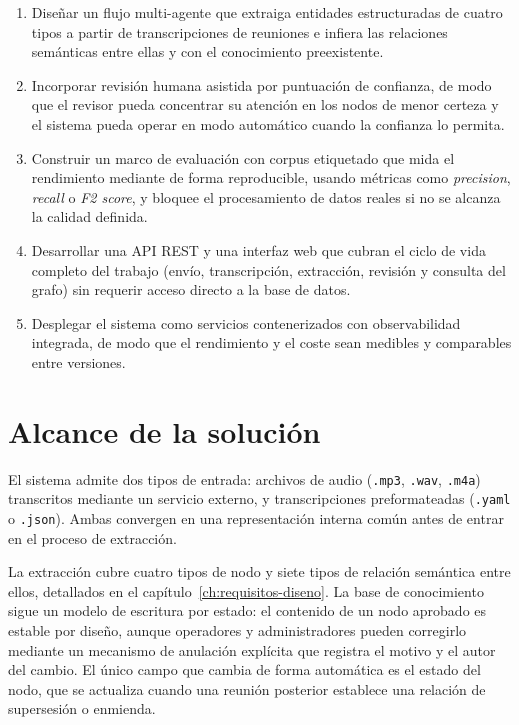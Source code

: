 \begin{enumerate}
  \item Diseñar un flujo multi-agente que extraiga entidades estructuradas de cuatro
        tipos a partir de transcripciones de reuniones e infiera las relaciones semánticas entre
        ellas y con el conocimiento preexistente.

  \item Incorporar revisión humana asistida por puntuación de confianza, de modo que el revisor
        pueda concentrar su atención en los nodos de menor certeza y el sistema pueda operar en
        modo automático cuando la confianza lo permita.

  \item Construir un marco de evaluación con corpus etiquetado que mida el rendimiento mediante
        de forma reproducible, usando métricas como \textit{precision}, \textit{recall} o \textit{F2 score},
        y bloquee el procesamiento de datos reales si no se alcanza la calidad definida.

  \item Desarrollar una \ac{API} REST y una interfaz web que cubran el ciclo de vida completo del
        trabajo (envío, transcripción, extracción, revisión y consulta del grafo) sin requerir
        acceso directo a la base de datos.

  \item Desplegar el sistema como servicios contenerizados con observabilidad integrada, de modo
        que el rendimiento y el coste sean medibles y comparables entre versiones.
\end{enumerate}

\section{Alcance de la solución}
\label{sec:alcance}

El sistema admite dos tipos de entrada: archivos de audio (\texttt{.mp3}, \texttt{.wav},
\texttt{.m4a}) transcritos mediante un servicio externo, y transcripciones preformateadas
(\texttt{.yaml} o \texttt{.json}). Ambas convergen en una representación interna común antes
de entrar en el proceso de extracción.

La extracción cubre cuatro tipos de nodo y siete tipos de relación semántica entre ellos,
detallados en el capítulo~\ref{ch:requisitos-diseno}. La base de conocimiento sigue un modelo
de escritura por estado: el contenido de un nodo aprobado es estable por diseño, aunque
operadores y administradores pueden corregirlo mediante un mecanismo de anulación explícita
que registra el motivo y el autor del cambio. El único campo que cambia de forma automática
es el estado del nodo, que se actualiza cuando una reunión posterior establece una relación
de supersesión o enmienda.

